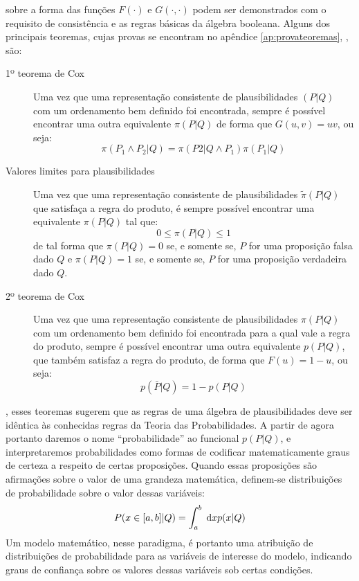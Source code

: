  sobre a forma das funções $F(\cdot)$ e $G(\cdot,\cdot)$ podem ser demonstrados com o requisito de consistência e as regras básicas da álgebra booleana. Alguns dos principais teoremas, cujas provas se encontram no apêndice \ref{ap:provateoremas}, \emph{}, são:
\begin{description}
 \item[1º teorema de Cox]
\begin{Teorema}
    Uma vez que uma representação consistente de plausibilidades $(P|Q)$ com um ordenamento bem definido foi encontrada, sempre é possível encontrar uma outra equivalente $\pi(P|Q)$ de forma que $G(u,v) = uv$, ou seja:
    \begin{equation}
	\label{eq:productrule}
	\pi(P_1\wedge P_2|Q) = \pi(P2 | Q \wedge P_1) \pi(P_1| Q)
    \end{equation}
\end{Teorema}

\item[Valores limites para plausibilidades]
\begin{Teorema}
  Uma vez que uma representação consistente de plausibilidades $\tilde{\pi}(P|Q)$ que satisfaça a regra do produto, é sempre possível encontrar uma equivalente $\pi(P|Q)$ tal que:
 \begin{equation}
    0 \le \pi(P|Q) \le 1
 \end{equation}
 de tal forma que $\pi(P|Q) = 0$ se, e somente se, $P$ for uma proposição falsa dado $Q$ e $\pi(P|Q) = 1$ se, e somente se, $P$ for uma proposição verdadeira dado $Q$.
\end{Teorema}
\item[2º teorema de Cox]
\begin{Teorema}
 Uma vez que uma representação consistente de plausibilidades $\pi(P|Q)$ com um ordenamento bem definido foi encontrada para a qual vale a regra do produto, sempre é possível encontrar uma outra equivalente $p(P|Q)$, que também satisfaz a regra do produto, de forma que $F(u) = 1 - u$, ou seja:
 \begin{equation}
 p(\bar{P} | Q) = 1 - p(P|Q)
 \end{equation}
\end{Teorema}
\end{description}

, esses teoremas sugerem que as regras de uma álgebra de plausibilidades deve ser idêntica às conhecidas regras da Teoria das Probabilidades. A partir de agora portanto daremos o nome ``probabilidade'' ao funcional $p(P|Q)$, e interpretaremos probabilidades como formas de codificar matematicamente graus de certeza a respeito de certas proposições. Quando essas proposições são afirmações sobre o valor de uma grandeza matemática, definem-se distribuições de probabilidade sobre o valor dessas variáveis:
\begin{equation}
 P(x \in [a,b] | Q) = \int_{a}^{b}\;\mathrm{d} x p(x | Q)
\end{equation}
Um modelo matemático, nesse paradigma, é portanto uma atribuição de distribuições de probabilidade para as variáveis de interesse do modelo, indicando graus de confiança sobre os valores dessas variáveis sob certas condições. 

